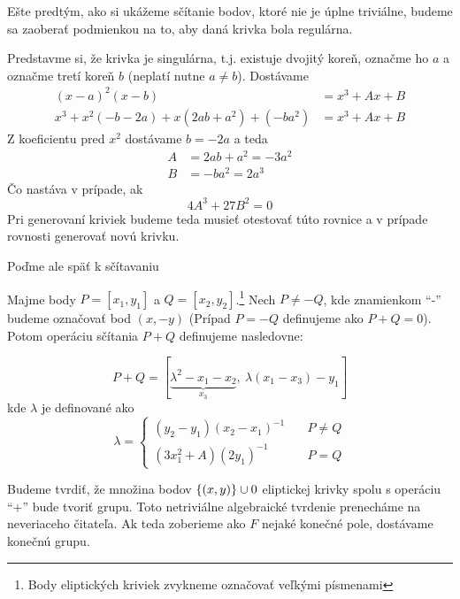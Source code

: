 Ešte predtým, ako si ukážeme sčítanie bodov, ktoré nie je úplne
triviálne, budeme sa zaoberať podmienkou na to, aby daná krivka bola
regulárna.

Predstavme si, že krivka je singulárna, t.j. existuje dvojitý koreň,
označme ho $a$ a označme tretí koreň $b$ (neplatí nutne $a\ne b$).
Dostávame
\begin{align*}
    (x-a)^2 (x-b) &= x^3 + Ax + B \\
    x^3 + x^2 (-b -2a) + x (2ab + a^2) + (-b a^2) &= x^3 + Ax + B
\end{align*}
Z koeficientu pred $x^2$ dostávame $b=-2a$ a teda
\begin{align*}
    A &= 2ab + a^2 = -3 a^2 \\
    B &= -b a^2 = 2 a^3
\end{align*}
Čo nastáva v prípade, ak
\begin{equation*}
    4 A^3 + 27 B^2 = 0
\end{equation*}
Pri generovaní kriviek budeme teda musieť otestovať túto rovnice a v
prípade rovnosti generovať novú krivku.

Poďme ale späť k sčítavaniu
\begin{definicia}
    Majme body $P=[x_1,y_1]$ a $Q=[x_2,y_2]$.\footnote{Body
        eliptických kriviek zvykneme označovať veľkými písmenami}
    Nech $P \ne -Q$, kde znamienkom ``-'' budeme označovať
    bod $(x,-y)$ (Prípad $P = -Q$ definujeme ako $P+Q=0$).
    Potom operáciu sčítania $P+Q$ definujeme nasledovne:

    \begin{equation*}
        P+Q = [ \underbrace{\lambda^2 - x_1 - x_2}_{x_3}, \ 
            \lambda (x_1 - x_3) - y_1]
    \end{equation*}
    kde $\lambda$ je definované ako
    \begin{equation*}
        \lambda =
            \begin{cases}
                (y_2 -y_1)(x_2 - x_1)^{-1} \quad & P \ne Q \\
                (3 x_1^2 + A)(2 y_1)^{-1} \quad & P = Q
            \end{cases}
    \end{equation*}
\end{definicia}

Budeme tvrdiť, že množina bodov $\{(x,y)\} \cup 0$
eliptickej krivky spolu s operáciu ``+'' bude tvoriť grupu. Toto
netriviálne algebraické tvrdenie prenecháme na neveriaceho
čitateľa. Ak teda zoberieme ako $F$ nejaké konečné
pole, dostávame konečnú grupu.

